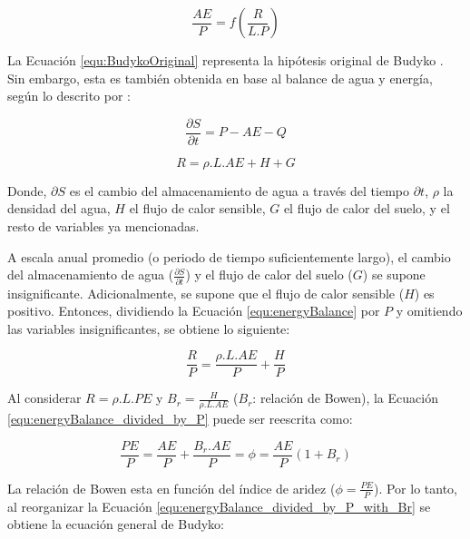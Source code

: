 \documentclass[12pt]{article}
\begin{document}
\begin{equation}
\frac{AE}{P} = f\left ( \frac{R}{L.P} \right ) 
\label{equ:BudykoOriginal}
\end{equation}

La Ecuación \ref{equ:BudykoOriginal} representa la hipótesis original de Budyko \citep{budyko1958heat}. Sin embargo, esta es también obtenida en base al balance de agua y energía, según lo descrito por \citet{arora2002use}:

\begin{equation}
\frac{\partial S}{\partial t} = P - AE - Q
\label{equ:waterBalance}
\end{equation}

\begin{equation}
R  = \rho .L.AE + H + G
\label{equ:energyBalance}
\end{equation}

Donde, $\partial S$ es el cambio del almacenamiento de agua a través del tiempo $\partial t$, $\rho$ la densidad del agua, $H$ el flujo de calor sensible, $G$ el flujo de calor del suelo, y el resto de variables ya mencionadas. 

A escala anual promedio (o periodo de tiempo suficientemente largo), el cambio del almacenamiento de agua ($\frac{\partial S}{\partial t}$) y el flujo de calor del suelo ($G$) se supone insignificante. Adicionalmente, se supone que el flujo de calor sensible ($H$) es positivo. Entonces, dividiendo la Ecuación \ref{equ:energyBalance} por $P$ y omitiendo las variables insignificantes, se obtiene lo siguiente:

\begin{equation}
\frac{R}{P}  = \frac{\rho .L.AE}{P} + \frac{H}{P} \label{equ:energyBalance_divided_by_P}
\end{equation}

Al considerar $R  = \rho .L.PE$ y $B_{r} = \frac{H}{\rho .L.AE}$ ($B_{r}$: relación de Bowen), la Ecuación \ref{equ:energyBalance_divided_by_P} puede ser reescrita como:

\begin{equation}
\frac{PE}{P} = \frac{AE}{P} + \frac{B_{r}.AE}{P} = \phi = \frac{AE}{P}(1 + B_{r})
\label{equ:energyBalance_divided_by_P_with_Br}
\end{equation}

La relación de Bowen esta en función del índice de aridez ($\phi = \frac{PE}{P}$). Por lo tanto, al reorganizar la Ecuación \ref{equ:energyBalance_divided_by_P_with_Br} se obtiene la ecuación general de Budyko:
\end{document}
